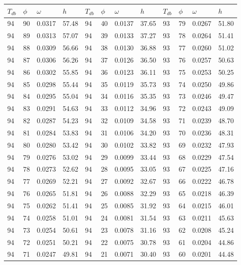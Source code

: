 \begin{tabular}{llll|llll|llll}
 \toprule 
\(T_{db}\) & \(\phi\) & \(\omega\) & \(h\) & \(T_{db}\) & \(\phi\) & \(\omega\) & \(h\) & \(T_{db}\) & \(\phi\) & \(\omega\) & \(h\)  \\ \midrule 
94 & 90 & 0.0317 & 57.48 & 94 & 40 & 0.0137 & 37.65 & 93 & 79 & 0.0267 & 51.80\\
94 & 89 & 0.0313 & 57.07 & 94 & 39 & 0.0133 & 37.27 & 93 & 78 & 0.0264 & 51.41\\
94 & 88 & 0.0309 & 56.66 & 94 & 38 & 0.0130 & 36.88 & 93 & 77 & 0.0260 & 51.02\\
94 & 87 & 0.0306 & 56.26 & 94 & 37 & 0.0126 & 36.50 & 93 & 76 & 0.0257 & 50.63\\
94 & 86 & 0.0302 & 55.85 & 94 & 36 & 0.0123 & 36.11 & 93 & 75 & 0.0253 & 50.25\\
94 & 85 & 0.0298 & 55.44 & 94 & 35 & 0.0119 & 35.73 & 93 & 74 & 0.0250 & 49.86\\
94 & 84 & 0.0295 & 55.04 & 94 & 34 & 0.0116 & 35.35 & 93 & 73 & 0.0246 & 49.47\\
94 & 83 & 0.0291 & 54.63 & 94 & 33 & 0.0112 & 34.96 & 93 & 72 & 0.0243 & 49.09\\
94 & 82 & 0.0287 & 54.23 & 94 & 32 & 0.0109 & 34.58 & 93 & 71 & 0.0239 & 48.70\\
94 & 81 & 0.0284 & 53.83 & 94 & 31 & 0.0106 & 34.20 & 93 & 70 & 0.0236 & 48.31\\
94 & 80 & 0.0280 & 53.42 & 94 & 30 & 0.0102 & 33.82 & 93 & 69 & 0.0232 & 47.93\\
94 & 79 & 0.0276 & 53.02 & 94 & 29 & 0.0099 & 33.44 & 93 & 68 & 0.0229 & 47.54\\
94 & 78 & 0.0273 & 52.62 & 94 & 28 & 0.0095 & 33.05 & 93 & 67 & 0.0225 & 47.16\\
94 & 77 & 0.0269 & 52.21 & 94 & 27 & 0.0092 & 32.67 & 93 & 66 & 0.0222 & 46.78\\
94 & 76 & 0.0265 & 51.81 & 94 & 26 & 0.0088 & 32.29 & 93 & 65 & 0.0218 & 46.39\\
94 & 75 & 0.0262 & 51.41 & 94 & 25 & 0.0085 & 31.92 & 93 & 64 & 0.0215 & 46.01\\
94 & 74 & 0.0258 & 51.01 & 94 & 24 & 0.0081 & 31.54 & 93 & 63 & 0.0211 & 45.63\\
94 & 73 & 0.0254 & 50.61 & 94 & 23 & 0.0078 & 31.16 & 93 & 62 & 0.0208 & 45.24\\
94 & 72 & 0.0251 & 50.21 & 94 & 22 & 0.0075 & 30.78 & 93 & 61 & 0.0204 & 44.86\\
94 & 71 & 0.0247 & 49.81 & 94 & 21 & 0.0071 & 30.40 & 93 & 60 & 0.0201 & 44.48\\

\end{tabular}
